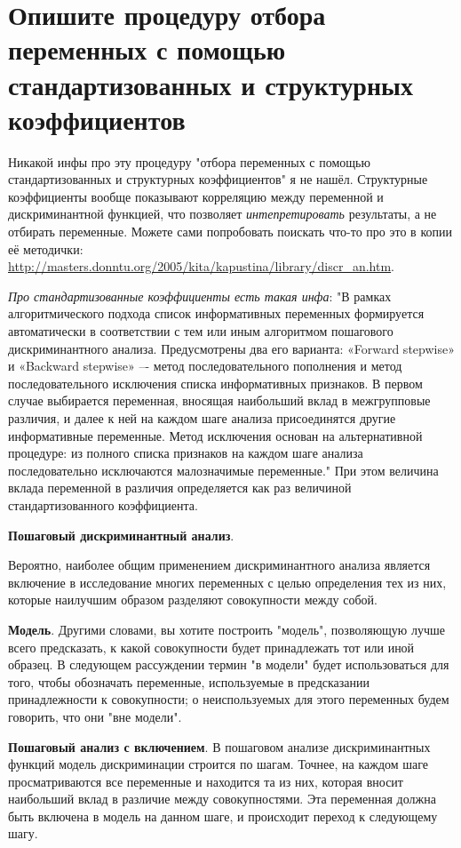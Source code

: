 \documentclass[a4paper, 12pt]{article}
\begin{document}
\section{Опишите процедуру отбора переменных с помощью стандартизованных и структурных коэффициентов}
Никакой инфы про эту процедуру "отбора переменных с помощью стандартизованных и структурных коэффициентов" я не нашёл. Структурные коэффициенты вообще показывают корреляцию между переменной и дискриминантной функцией, что позволяет {\it интепретировать} результаты, а не отбирать переменные. Можете сами попробовать поискать что-то про это в копии её методички: \url{http://masters.donntu.org/2005/kita/kapustina/library/discr_an.htm}.

{\it Про стандартизованные коэффициенты есть такая инфа}: "В рамках алгоритмического подхода список информативных
переменных формируется автоматически в соответствии с тем
или иным алгоритмом пошагового дискриминантного анализа.
Предусмотрены два его варианта: «Forward stepwise» и
«Backward stepwise» –- метод последовательного пополнения и
метод последовательного исключения списка информативных
признаков. В первом случае выбирается переменная, вносящая
наибольший вклад в межгрупповые различия, и далее к ней на
каждом шаге анализа присоединятся другие информативные переменные. Метод исключения основан на альтернативной процедуре: из полного списка признаков на каждом шаге анализа последовательно исключаются малозначимые переменные." При этом величина вклада переменной в различия определяется как раз величиной стандартизованного коэффициента.

\textbf{Пошаговый дискриминантный анализ}.

Вероятно, наиболее общим применением дискриминантного анализа является включение в исследование многих переменных с целью определения тех из них, которые наилучшим образом разделяют совокупности между собой.

\textbf{Модель}. Другими словами, вы хотите построить "модель", позволяющую лучше всего предсказать, к какой совокупности будет принадлежать тот или иной образец. В следующем рассуждении термин "в модели" будет использоваться для того, чтобы обозначать переменные, используемые в предсказании принадлежности к совокупности; о неиспользуемых для этого переменных будем говорить, что они "вне модели".

\textbf{Пошаговый анализ с включением}. В пошаговом анализе дискриминантных функций модель дискриминации строится по шагам. Точнее, на каждом шаге просматриваются все переменные и находится та из них, которая вносит наибольший вклад в различие между совокупностями. Эта переменная должна быть включена в модель на данном шаге, и происходит переход к следующему шагу.
\end{document}
